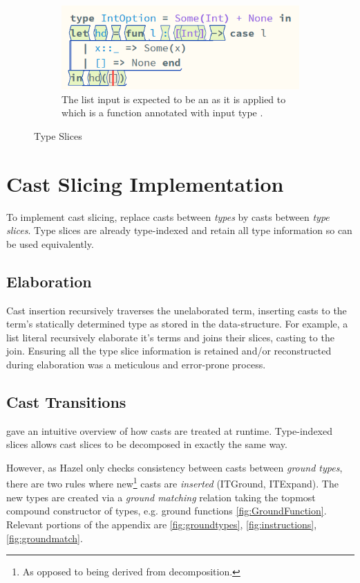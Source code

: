\begin{figure}[h]
\begin{subfigure}[t]{0.45\textwidth}
\centering
\includegraphics[width=1\textwidth]{Media/Figures/list_ana}
\caption{The list input is expected to be an \code{[Int]} as it is applied to  which is a function annotated with input type \code{[Int]}.}
\end{subfigure}
\caption{Type Slices}
\label{fig:SliceExamples}
\end{figure}

\section{Cast Slicing Implementation}\label{sec:CastSlicingImplementation}
To implement cast slicing, replace casts between \textit{types} by casts between \textit{type slices}. Type slices are already type-indexed and retain all type information so can be used equivalently.

\subsection{Elaboration}\label{sec:Elaboration}
Cast insertion recursively traverses the unelaborated term, inserting casts to the term's statically determined type as stored in the  data-structure. For example, a list literal recursively elaborate it's terms and joins their slices, casting to the join. Ensuring all the type slice information is retained and/or reconstructed during elaboration was a meticulous and error-prone process.

\subsection{Cast Transitions}
 gave an intuitive overview of how casts are treated at runtime. Type-indexed slices allows cast slices to be decomposed in exactly the same way. 

However, as Hazel only checks consistency between casts between \textit{ground types}, there are two rules where new\footnote{As opposed to being derived from decomposition.} casts are \textit{inserted} (ITGround, ITExpand). The new types are created via a \textit{ground matching} relation taking the topmost compound constructor of types, e.g. ground functions \cref{fig:GroundFunction}. Relevant portions of the appendix are \cref{fig:groundtypes}, \cref{fig:instructions}, \cref{fig:groundmatch}.

